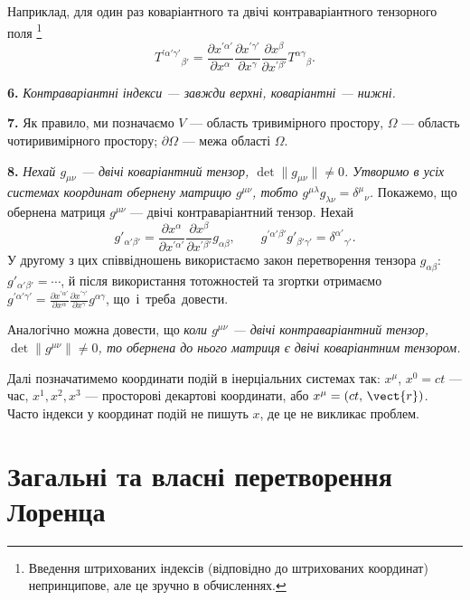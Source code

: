 Наприклад, для один раз коваріантного та двічі контраваріантного
тензорного поля%
\footnote{Введення штрихованих індексів (відповідно до
штрихованих координат) непринципове, але це зручно в обчисленнях.}
\[
  T^{\prime\alpha'\gamma'}{}_{\beta'} =
    \frac{\partial x^{\prime\alpha'}}{\partial x^\alpha}
    \frac{\partial x^{\prime\gamma'}}{\partial x^\gamma}
    \frac{\partial x^\beta}{\partial x^{\prime\beta'}}
    T^{\alpha\gamma}{}_\beta.
\]

\textbf{6.} \textit{Контраваріантні індекси --- завжди верхні,
коваріантні --- нижні.}

\textbf{7.} Як правило, ми позначаємо $V$ --- область тривимірного
простору, $\Omega$ --- область чотиривимірного простору; $\partial\Omega$
--- межа області $\Omega$.

\textbf{8.} \textit{Нехай $g_{\mu\nu}$ --- двічі коваріантний тензор,
$\det\|g_{\mu\nu}\| \ne 0$. Утворимо в усіх системах координат обернену
матрицю $g^{\mu\nu}$, тобто $g^{\mu\lambda}g_{\lambda\nu} = \delta^\mu{}_\nu$.}
Покажемо, що обернена матриця $g^{\mu\nu}$ --- двічі контраваріантний тензор.
Нехай
\[
  g'_{\alpha'\beta'} = \frac{\partial x^\alpha}{\partial x^{\prime\alpha'}}
                       \frac{\partial x^\beta}{\partial x^{\prime\beta'}}
                       g_{\alpha\beta},\qquad
  g^{\prime\alpha'\beta'} g'_{\beta'\gamma'} = \delta^{\alpha'}{}_{\gamma'}.
\]
У другому з цих співвідношень використаємо закон перетворення тензора
$g_{\alpha\beta}$: $g'_{\alpha'\beta'} = \cdots$, й після використання тотожностей
та згортки отримаємо $g^{\prime\alpha'\gamma'} = \frac{\partial x^{\prime\alpha'}}{\partial x^\alpha}
\frac{\partial x^{\prime\gamma'}}{\partial x^\gamma} g^{\alpha\gamma}$, що~і~треба~довести.

Аналогічно можна довести, що \textit{коли $g^{\mu\nu}$ --- двічі
контраваріантний тензор, $\det\|g^{\mu\nu}\| \ne 0$, то обернена до нього
матриця є двічі коваріантним тензором.}

Далі позначатимемо координати подій в інерціальних системах так:
$x^\mu$, $x^0 = ct$ --- час, $x^1, x^2, x^3$ --- просторові декартові координати,
або $x^\mu = (ct,\,\vect{r})$.
Часто індекси у координат подій не пишуть $x$, де це не викликає проблем.

\section{Загальні та власні перетворення Лоренца}

